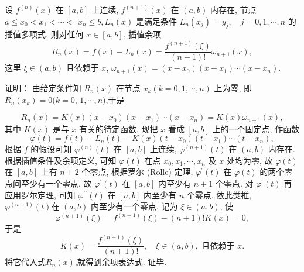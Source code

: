 \begin{tcolorbox}[breakable,title=定理]
 设 $ f^{(n)}(x) $ 在 $ [a, b] $ 上连续, $ f^{(n+1)}(x) $ 在 $ (a, b) $ 内存在, 节点 $ a \leqslant x_{0}<x_{1}<\cdots< $ $ x_{n} \leqslant b, L_{n}(x) $ 是满足条件 $L_{n}\left(x_{j}\right)=y_{j}, \quad j=0,1, \cdots, n$ 的插值多项式, 则对任何 $ x \in[a, b] $, 插值余项
$$
R_{n}(x)=f(x)-L_{n}(x)=\frac{f^{(n+1)}(\xi)}{(n+1) !} \omega_{n+1}(x),
$$
这里 $ \xi \in(a, b) $ 且依赖于 $ x$, $\omega_{n+1}(x)=\left(x-x_{0}\right)\left(x-x_{1}\right) \cdots\left(x-x_{n}\right)$.

\tcblower
证明： 由给定条件知 $ R_{n}(x) $ 在节点 $ x_{k}(k=0,1, \cdots, n) $ 上为零, 即 $ R_{n}\left(x_{k}\right)=0(k=0 $, $ 1, \cdots, n) $,于是

$$
R_{n}(x)=K(x)\left(x-x_{0}\right)\left(x-x_{1}\right) \cdots\left(x-x_{n}\right)=K(x) \omega_{n+1}(x),
$$
其中 $ K(x) $ 是与 $ x $ 有关的待定函数.
现把 $ x $ 看成 $ [a, b] $ 上的一个固定点, 作函数
$$
\varphi(t)=f(t)-L_{n}(t)-K(x)\left(t-x_{0}\right)\left(t-x_{1}\right) \cdots\left(t-x_{n}\right),
$$
根据 $ f $ 的假设可知 $ \varphi^{(n)}(t) $ 在 $ [a, b] $ 上连续, $ \varphi^{(n+1)}(t) $ 在 $ (a, b) $ 内存在. 根据插值条件及余项定义, 可知 $ \varphi(t) $ 在点 $ x_{0}, x_{1}, \cdots, x_{n} $ 及 $ x $ 处均为零, 故 $ \varphi(t) $ 在 $ [a, b] $ 上有 $ n+2 $ 个零点, 根据罗尔 (Rolle) 定理, $ \varphi^{\prime}(t) $ 在 $ \varphi(t) $ 的两个零点间至少有一个零点, 故 $ \varphi^{\prime}(t) $ 在 $ [a, b] $ 内至少有 $ n+1 $ 个零点. 对 $ \varphi^{\prime}(t) $ 再应用罗尔定理, 可知 $ \varphi^{\prime \prime}(t) $ 在 $ [a, b] $ 内至少有 $ n $ 个零点. 依此类推, $ \varphi^{(n+1)}(t) $在 $ (a, b) $ 内至少有一个零点, 记为 $ \xi \in(a, b) $, 使
$$
\varphi^{(n+1)}(\xi)=f^{(n+1)}(\xi)-(n+1) ! K(x)=0,
$$
于是
$$
K(x)=\frac{f^{(n+1)}(\xi)}{(n+1) !}, \quad \xi \in(a, b), \text { 且依赖于 } x .
$$
将它代入式$R_n(x)$,就得到余项表达式. 证毕.
\end{tcolorbox}



